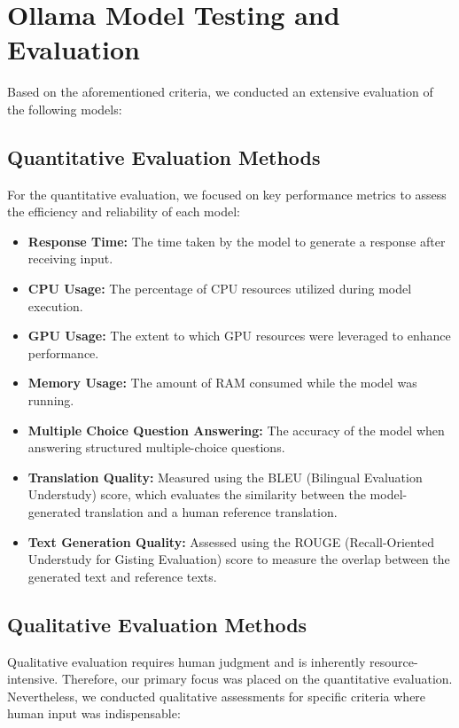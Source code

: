 \section{Ollama Model Testing and Evaluation}

Based on the aforementioned criteria, we conducted an extensive evaluation of the following models:

\subsection{Quantitative Evaluation Methods}

For the quantitative evaluation, we focused on key performance metrics to assess the efficiency and reliability of each model:

\begin{itemize}
    \item \textbf{Response Time:} The time taken by the model to generate a response after receiving input.
    \item \textbf{CPU Usage:} The percentage of CPU resources utilized during model execution.
    \item \textbf{GPU Usage:} The extent to which GPU resources were leveraged to enhance performance.
    \item \textbf{Memory Usage:} The amount of RAM consumed while the model was running.
    \item \textbf{Multiple Choice Question Answering:} The accuracy of the model when answering structured multiple-choice questions.
    \item \textbf{Translation Quality:} Measured using the BLEU (Bilingual Evaluation Understudy) score, which evaluates the similarity between the model-generated translation and a human reference translation. \cite{BLUE-Score-Wikipedia}
    \item \textbf{Text Generation Quality:} Assessed using the ROUGE (Recall-Oriented Understudy for Gisting Evaluation) score to measure the overlap between the generated text and reference texts.
\end{itemize}

\cite{ROUGE-BLUE-Score}


\subsection{Qualitative Evaluation Methods}

Qualitative evaluation requires human judgment and is inherently resource-intensive. Therefore, our primary focus was placed on the quantitative evaluation. Nevertheless, we conducted qualitative assessments for specific criteria where human input was indispensable:

